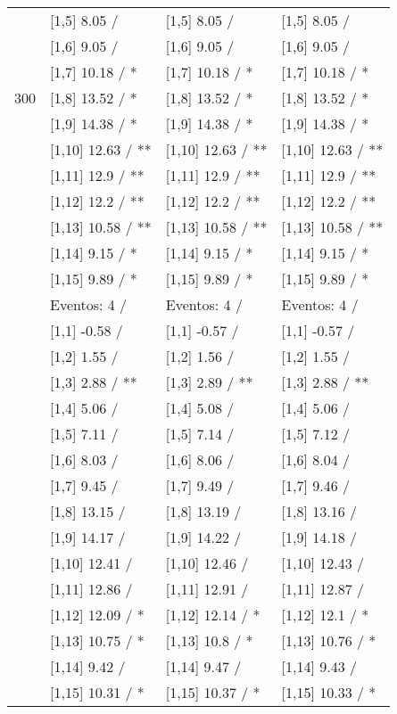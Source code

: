 \begin{table}
\begin{tabular}[t]{llll}
 & {}[1,5] 8.05  / & {}[1,5] 8.05  / & {}[1,5] 8.05  /\\
 & {}[1,6] 9.05  / & {}[1,6] 9.05  / & {}[1,6] 9.05  /\\
 & {}[1,7] 10.18  / * & {}[1,7] 10.18  / * & {}[1,7] 10.18  / *\\
300 & {}[1,8] 13.52  / * & {}[1,8] 13.52  / * & {}[1,8] 13.52  / *\\
\addlinespace
 & {}[1,9] 14.38  / * & {}[1,9] 14.38  / * & {}[1,9] 14.38  / *\\
 & {}[1,10] 12.63  / ** & {}[1,10] 12.63  / ** & {}[1,10] 12.63  / **\\
 & {}[1,11] 12.9  / ** & {}[1,11] 12.9  / ** & {}[1,11] 12.9  / **\\
 & {}[1,12] 12.2  / ** & {}[1,12] 12.2  / ** & {}[1,12] 12.2  / **\\
 & {}[1,13] 10.58  / ** & {}[1,13] 10.58  / ** & {}[1,13] 10.58  / **\\
\addlinespace
 & {}[1,14] 9.15  / * & {}[1,14] 9.15  / * & {}[1,14] 9.15  / *\\
 & {}[1,15] 9.89  / * & {}[1,15] 9.89  / * & {}[1,15] 9.89  / *\\
 & Eventos:  4 / & Eventos:  4 / & Eventos:  4 /\\
 & {}[1,1] -0.58  / & {}[1,1] -0.57  / & {}[1,1] -0.57  /\\
 & {}[1,2] 1.55  / & {}[1,2] 1.56  / & {}[1,2] 1.55  /\\
\addlinespace
 & {}[1,3] 2.88  / ** & {}[1,3] 2.89  / ** & {}[1,3] 2.88  / **\\
 & {}[1,4] 5.06  / & {}[1,4] 5.08  / & {}[1,4] 5.06  /\\
 & {}[1,5] 7.11  / & {}[1,5] 7.14  / & {}[1,5] 7.12  /\\
 & {}[1,6] 8.03  / & {}[1,6] 8.06  / & {}[1,6] 8.04  /\\
 & {}[1,7] 9.45  / & {}[1,7] 9.49  / & {}[1,7] 9.46  /\\
\addlinespace
500 & {}[1,8] 13.15  / & {}[1,8] 13.19  / & {}[1,8] 13.16  /\\
 & {}[1,9] 14.17  / & {}[1,9] 14.22  / & {}[1,9] 14.18  /\\
 & {}[1,10] 12.41  / & {}[1,10] 12.46  / & {}[1,10] 12.43  /\\
 & {}[1,11] 12.86  / & {}[1,11] 12.91  / & {}[1,11] 12.87  /\\
 & {}[1,12] 12.09  / * & {}[1,12] 12.14  / * & {}[1,12] 12.1  / *\\
\addlinespace
 & {}[1,13] 10.75  / * & {}[1,13] 10.8  / * & {}[1,13] 10.76  / *\\
 & {}[1,14] 9.42  / & {}[1,14] 9.47  / & {}[1,14] 9.43  /\\
 & {}[1,15] 10.31  / * & {}[1,15] 10.37  / * & {}[1,15] 10.33  / *\\
\bottomrule
\end{tabular}
\end{table}
